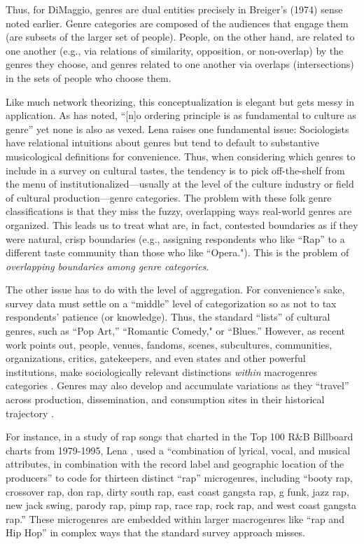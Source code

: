 \documentclass[a4paper,12pt]{extarticle}
\begin{document}
Thus, for DiMaggio, genres are dual entities precisely in Breiger's (1974) sense noted earlier. Genre categories are composed of the audiences that engage them (are subsets of the larger set of people). People, on the other hand, are related to one another (e.g., via relations of similarity, opposition, or non-overlap) by the genres they choose, and genres related to one another via overlaps (intersections) in the sets of people who choose them.

Like much network theorizing, this conceptualization is elegant but gets messy in application. As \citet[149]{lena2015relational} has noted, ``[n]o ordering principle is as fundamental to culture as genre'' yet none is also as vexed. Lena raises one fundamental issue: Sociologists have relational intuitions about genres but tend to default to substantive musicological definitions for convenience. Thus, when considering which genres to include in a survey on cultural tastes, the tendency is to pick off-the-shelf from the menu of institutionalized---usually at the level of the culture industry or field of cultural production---genre categories. The problem with these folk genre classifications is that they miss the fuzzy, overlapping ways real-world genres are organized. This leads us to treat what are, in fact, contested boundaries as if they were natural, crisp boundaries (e.g., assigning respondents who like ``Rap'' to a different taste community than those who like ``Opera."). This is the problem of \textit{overlapping boundaries among genre categories}. 

The other issue has to do with the level of aggregation. For convenience’s sake, survey data must settle on a ``middle'' level of categorization so as not to tax respondents' patience (or knowledge). Thus, the standard ``lists'' of cultural genres, such as ``Pop Art,'' ``Romantic Comedy," or ``Blues.'' However, as recent work points out, people, venues, fandoms, scenes, subcultures, communities, organizations, critics, gatekeepers, and even states and other powerful institutions, make sociologically relevant distinctions \textit{within} macrogenres categories \citep{hesmondhalgh2005subcultures, Holt2007, Van_Poecke2018, Hield2014-xe}. Genres may also develop and accumulate variations as they ``travel'' across production, dissemination, and consumption sites in their historical trajectory \citep{Lena2012}. 

For instance, in a study of rap songs that charted in the Top 100 R\&B Billboard charts from 1979-1995, Lena \citeyearpar[299]{lena2004meaning}, used a ``combination of lyrical, vocal, and musical attributes, in combination with the record label and geographic location of the producers'' to code for thirteen distinct ``rap'' microgenres, including ``booty rap, crossover rap, don rap, dirty south rap, east coast gangsta rap, g funk, jazz rap, new jack swing, parody rap, pimp rap, race rap, rock rap, and west coast gangsta rap.'' These microgenres are embedded within larger macrogenres like ``rap and Hip Hop'' in complex ways that the standard survey approach misses.
\end{document}
